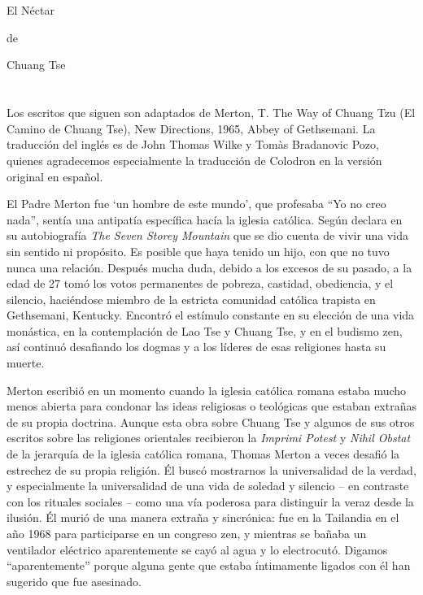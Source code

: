 \documentclass[hidelinks]{memoir}
\begin{document}
	\chapter*{}

	El Néctar
	
	de
	
	Chuang Tse
	
	\chapter*{}
	
	Los escritos que siguen son adaptados de Merton, T. The Way of Chuang
	Tzu (El Camino de Chuang Tse), New Directions, 1965, Abbey of
	Gethsemani. La traducción del inglés es de John Thomas Wilke y Tomàs
	Bradanovic Pozo, quienes agradecemos especialmente la traducción de
	Colodron en la versión original en español.
	
	El Padre Merton fue `un hombre de este mundo', que profesaba ``Yo no
	creo nada'', sentía una antipatía específica hacía la iglesia católica.
	Según declara en su autobiografía \textit{The Seven Storey Mountain} que
	se dio cuenta de vivir una vida sin sentido ni propósito. Es posible que
	haya tenido un hijo, con que no tuvo nunca una relación. Después mucha
	duda, debido a los excesos de su pasado, a la edad de 27 tomó los votos
	permanentes de pobreza, castidad, obediencia, y el silencio, haciéndose
	miembro de la estricta comunidad católica trapista en Gethsemani,
	Kentucky. Encontró el estímulo constante en su elección de una vida
	monástica, en la contemplación de Lao Tse y Chuang Tse, y en el budismo
	zen, así continuó desafiando los dogmas y a los líderes de esas
	religiones hasta su muerte.
	
	Merton escribió en un momento cuando la iglesia católica romana estaba
	mucho menos abierta para condonar las ideas religiosas o teológicas que
	estaban extrañas de su propia doctrina. Aunque esta obra sobre Chuang
	Tse y algunos de sus otros escritos sobre las religiones orientales
	recibieron la \textit{Imprimi Potest} y \textit{Nihil Obstat} de la
	jerarquía de la iglesia católica romana, Thomas Merton a veces desafió
	la estrechez de su propia religión. Él buscó mostrarnos la universalidad
	de la verdad, y especialmente la universalidad de una vida de soledad y
	silencio -- en contraste con los rituales sociales -- como una vía
	poderosa para distinguir la veraz desde la ilusión. Él murió de una
	manera extraña y sincrónica: fue en la Tailandia en el año 1968 para
	participarse en un congreso zen, y mientras se bañaba un ventilador
	eléctrico aparentemente se cayó al agua y lo electrocutó. Digamos
	``aparentemente'' porque alguna gente que estaba íntimamente ligados con
	él han sugerido que fue asesinado.
	
\end{document}

